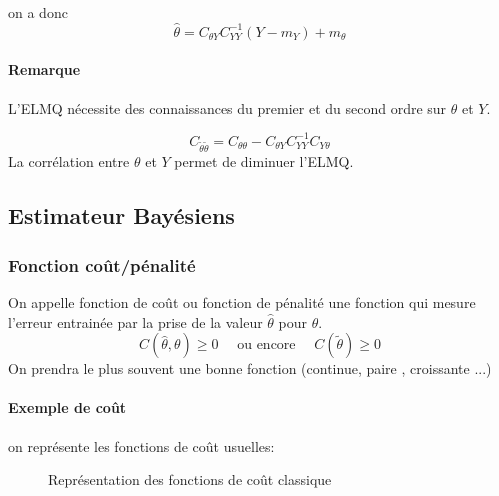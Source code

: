 \documentclass[main.tex]{subfiles}
\begin{document}
\begin{enumerate}[label=\arabic*)]
  on a donc
  \[
    \boxed{\hat{\theta}=C_{\theta Y}C_{YY}^{-1}(Y-m_Y)+m_\theta}
  \]

  \paragraph{Remarque} L'ELMQ nécessite des connaissances du premier et du second ordre sur $\theta$ et $Y$.

  \begin{prop}
   \[
     C_{\tilde{\theta}\tilde{\theta}} = C_{\theta\theta}-C_{\theta Y}C_{YY}^{-1}C_{Y\theta}
   \]
   La corrélation entre $\theta$ et $Y$ permet de diminuer l'ELMQ.
 \end{prop}
\end{enumerate}


\subsection{Estimateur Bayésiens}
\subsubsection{Fonction coût/pénalité}
\begin{defin}
  On appelle fonction de coût ou fonction de pénalité une fonction qui mesure l'erreur entrainée par la prise de la valeur $\hat{\theta}$ pour $\theta$.
  \[
    C(\hat{\theta},\theta) \geq 0 \quad \text{ ou encore }\quad C(\tilde{\theta}) \ge 0
  \]
  On prendra le plus souvent une \og bonne \fg{} fonction (continue, paire , croissante ...)
\end{defin}

\paragraph{Exemple de coût} on représente les fonctions de coût usuelles:

\begin{figure}[H]
  \centering
  \caption{Représentation des fonctions de coût classique}
\end{figure}
\end{document}
